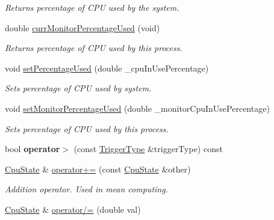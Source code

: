 \begin{DoxyCompactItemize}
\begin{DoxyCompactList}\small\item\em Returns percentage of C\+PU used by the system. \end{DoxyCompactList}\item 
double \hyperlink{classCpuState_a3b65b3dd5bb67181f0fa643ef9f3c25a}{curr\+Monitor\+Percentage\+Used} (void)\hypertarget{classCpuState_a3b65b3dd5bb67181f0fa643ef9f3c25a}{}\label{classCpuState_a3b65b3dd5bb67181f0fa643ef9f3c25a}

\begin{DoxyCompactList}\small\item\em Returns percentage of C\+PU used by this process. \end{DoxyCompactList}\item 
void \hyperlink{classCpuState_a6d3715f1b8f189af792b675a2dc7f0c7}{set\+Percentage\+Used} (double \+\_\+cpu\+In\+Use\+Percentage)\hypertarget{classCpuState_a6d3715f1b8f189af792b675a2dc7f0c7}{}\label{classCpuState_a6d3715f1b8f189af792b675a2dc7f0c7}

\begin{DoxyCompactList}\small\item\em Sets percentage of C\+PU used by system. \end{DoxyCompactList}\item 
void \hyperlink{classCpuState_a1c42ccd8a57dd00ef2b15f963c9fd57e}{set\+Monitor\+Percentage\+Used} (double \+\_\+monitor\+Cpu\+In\+Use\+Percentage)\hypertarget{classCpuState_a1c42ccd8a57dd00ef2b15f963c9fd57e}{}\label{classCpuState_a1c42ccd8a57dd00ef2b15f963c9fd57e}

\begin{DoxyCompactList}\small\item\em Sets percentage of C\+PU used by this process. \end{DoxyCompactList}\item 
bool {\bfseries operator$>$} (const \hyperlink{structTriggerType}{Trigger\+Type} \&trigger\+Type) const \hypertarget{classCpuState_ad916c435388bfa5588db267b374dea00}{}\label{classCpuState_ad916c435388bfa5588db267b374dea00}

\item 
\hyperlink{classCpuState}{Cpu\+State} \& \hyperlink{classCpuState_a809a06f39eb017c89b6d9e025fa19e20}{operator+=} (const \hyperlink{classCpuState}{Cpu\+State} \&other)\hypertarget{classCpuState_a809a06f39eb017c89b6d9e025fa19e20}{}\label{classCpuState_a809a06f39eb017c89b6d9e025fa19e20}

\begin{DoxyCompactList}\small\item\em Addition operator. Used in mean computing. \end{DoxyCompactList}\item 
\hyperlink{classCpuState}{Cpu\+State} \& \hyperlink{classCpuState_a3e436b173911d6ac8bed63cb2d6b3566}{operator/=} (double val)\hypertarget{classCpuState_a3e436b173911d6ac8bed63cb2d6b3566}{}\label{classCpuState_a3e436b173911d6ac8bed63cb2d6b3566}


\end{DoxyCompactItemize}
